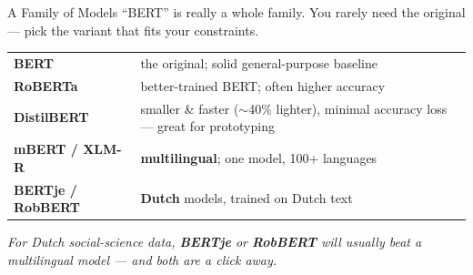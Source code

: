\documentclass[aspectratio=169]{beamer}
\begin{document}
\begin{frame}{A Family of Models}
\vspace{0.2cm}
{\small ``BERT'' is really a whole family. You rarely need the original --- pick the variant
that fits your constraints.}

\medskip
\begin{center}
\renewcommand{\arraystretch}{1.35}
{\small
\begin{tabular}{p{2.6cm}|p{9.5cm}}
\textbf{BERT} & the original; solid general-purpose baseline \\
\textbf{RoBERTa} & better-trained BERT; often higher accuracy \\
\textbf{DistilBERT} & smaller \& faster ($\sim$40\% lighter), minimal accuracy loss --- great for prototyping \\
\textbf{mBERT / XLM-R} & \textbf{multilingual}; one model, 100+ languages \\
\textbf{BERTje / RobBERT} & \textbf{Dutch} models, trained on Dutch text \\
\end{tabular}
}
\end{center}

\medskip
{\small\textcolor{midgray}{\textit{For Dutch social-science data, \textbf{BERTje} or
\textbf{RobBERT} will usually beat a multilingual model --- and both are a click away.}}}
\end{frame}
\end{document}
